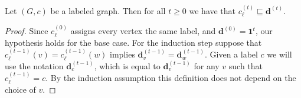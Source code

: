 \begin{lemma}\label{lem:deg-in-WL}
    Let $(G,c)$ be a labeled graph.
    Then for all $t \geq 0$ we have that 
    $c_\ell^{(t)} \sqsubseteq \mathbf{d}^{(t)}$. 
\end{lemma}
\begin{proof}
Since $c_\ell^{(0)}$ assigns every vertex the same label, and $\mathbf{d}^{(0)}=\mathbf{1}^t$, our hypothesis holds for the base case.
For the induction step suppose that $c_\ell^{(t-1)}(v)=c_\ell^{(t-1)}(w)$ implies $\mathbf{d}^{(t-1)}_v=\mathbf{d}^{(t-1)}_w$.
Given a label $c$ we will use the notation $\mathbf{d}^{(t-1)}_c$, which is equal to $\mathbf{d}^{(t-1)}_v$ for any $v$ such that $c_\ell^{(t-1)} = c$. By the induction assumption this definition does not depend on the choice of $v$.


\end{proof}
